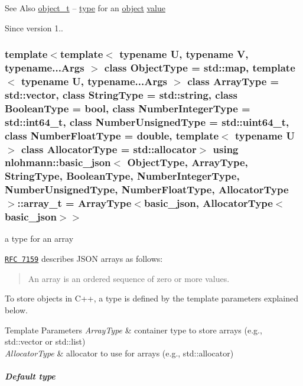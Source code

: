 \begin{DoxySeeAlso}{See Also}
\hyperlink{classnlohmann_1_1basic__json_a0ac9894c9de8dc551cf2e5f1c605537f}{object\-\_\-t} -- \hyperlink{classnlohmann_1_1basic__json_a5d466b240d0ba9f648d7fd4ff42359f5}{type} for an \hyperlink{classnlohmann_1_1basic__json_ad25b2f8c21e241e2d63455537a9294ff}{object} \hyperlink{classnlohmann_1_1basic__json_a0a2cbbd95862a623e7dc5c37e67dead0}{value}
\end{DoxySeeAlso}
\begin{DoxySince}{Since}
version 1.. 
\end{DoxySince}
\hypertarget{classnlohmann_1_1basic__json_ab00b882d39306d663c23dab110f5cae0}{
\subsubsection[{array\-\_\-t}]{\setlength{\rightskip}{0pt plus 5cm}template$<$template$<$ typename U, typename V, typename...\-Args $>$ class Object\-Type = std\-::map, template$<$ typename U, typename...\-Args $>$ class Array\-Type = std\-::vector, class String\-Type  = std\-::string, class Boolean\-Type  = bool, class Number\-Integer\-Type  = std\-::int64\-\_\-t, class Number\-Unsigned\-Type  = std\-::uint64\-\_\-t, class Number\-Float\-Type  = double, template$<$ typename U $>$ class Allocator\-Type = std\-::allocator$>$ using {\bf nlohmann\-::basic\-\_\-json}$<$ Object\-Type, Array\-Type, String\-Type, Boolean\-Type, Number\-Integer\-Type, Number\-Unsigned\-Type, Number\-Float\-Type, Allocator\-Type $>$\-::{\bf array\-\_\-t} =  Array\-Type$<${\bf basic\-\_\-json}, Allocator\-Type$<${\bf basic\-\_\-json}$>$$>$}}\label{classnlohmann_1_1basic__json_ab00b882d39306d663c23dab110f5cae0}


a type for an array 

\href{http://rfc7159.net/rfc7159}{\tt R\-F\-C 7159} describes J\-S\-O\-N arrays as follows\-: \begin{quotation}
An array is an ordered sequence of zero or more values.

\end{quotation}


To store objects in C++, a type is defined by the template parameters explained below.


\begin{DoxyTemplParams}{Template Parameters}
{\em Array\-Type} & container type to store arrays (e.\-g., {\ttfamily std\-::vector} or {\ttfamily std\-::list}) \\
\hline
{\em Allocator\-Type} & allocator to use for arrays (e.\-g., {\ttfamily std\-::allocator})\\
\hline
\end{DoxyTemplParams}
\subparagraph*{Default type}

